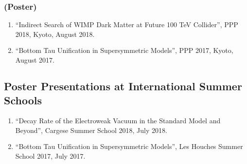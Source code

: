 \documentclass[12pt]{article}
\begin{document}
\subsubsection*{(Poster)}

\begin{enumerate}
  \item ``Indirect Search of WIMP Dark Matter at Future 100 TeV Collider'', PPP 2018, Kyoto, August 2018.
  \item ``Bottom Tau Unification in Supersymmetric Models'', PPP 2017, Kyoto, August 2017.
\end{enumerate}

\subsection*{Poster Presentations at International Summer Schools}

\begin{enumerate}
  \item ``Decay Rate of the Electroweak Vacuum in the Standard Model and Beyond'', Cargese Summer School 2018, July 2018.
  \item ``Bottom Tau Unification in Supersymmetric Models'', Les Houches Summer School 2017, July 2017.
\end{enumerate}
\end{document}
